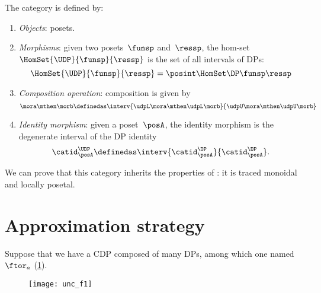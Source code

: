 \begin{ctdefinition}
    \label{def:UDP}
    The category \iindex{\UDP} is defined by:
    \begin{enumerate}
        \item \emph{Objects}: posets.
        \item \emph{Morphisms}: given two posets~$\funsp$ and~$\ressp$, the hom-set~$\HomSet{\UDP}{\funsp}{\ressp}$ is the set of all intervals of DPs:
              \begin{equation}
                  \HomSet{\UDP}{\funsp}{\ressp}=\posint \HomSet\DP\funsp\ressp
              \end{equation}
        \item \emph{Composition operation}: composition is given by
              \begin{equation}
                  \mora \mthen \morb \definedas \interv{ \udpL\mora\mthen \udpL\morb}{\udpU\mora\mthen \udpU\morb}
              \end{equation}
        \item \emph{Identity morphism}: given a poset~$\posA$, the identity morphism is the degenerate interval of the DP identity
              \begin{equation}
                  \catid^{\UDP}_{\posA} \definedas \interv{\catid^{\DP}_\posA}{\catid^{\DP}_\posA}.
              \end{equation}
    \end{enumerate}
\end{ctdefinition}

We can prove that this category inherits the properties of \DP: it is traced monoidal and locally posetal.


\section{Approximation strategy}
\label{sec:Approximation-results}


Suppose that we have a CDP composed of many DPs, among which one named~$\ftor_{a}$ (\cref{fig:consider1}).

\begin{figure}[h!]
    \texttt{[image: unc\_f1]}
    \caption{}
    \label{fig:consider1}
\end{figure}

